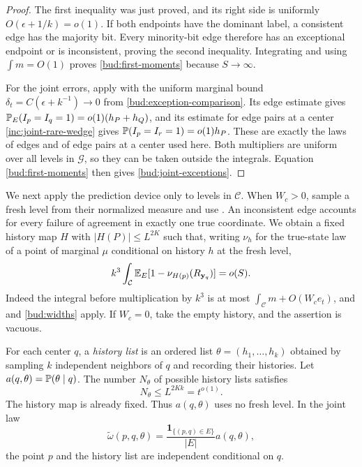 \begin{proof}
The first inequality was just proved, and its right side is uniformly
$O(\epsilon+1/k)=o(1)$.  If both endpoints have the dominant label,
a consistent edge has the majority bit.  Every minority-bit edge
therefore has an exceptional endpoint or is inconsistent, proving the
second inequality.  Integrating and using $\int m=O(1)$ proves
\eqref{bud:first-moments} because $S\to\infty$.

For the joint errors, apply  with the uniform marginal
bound $\delta_t=C(\epsilon+k^{-1})\to0$ from
\eqref{bud:exception-comparison}.  Its edge estimate gives
$\mathbb P_E(I_p=I_q=1)=o(1)(h_P+h_Q)$, and its estimate for edge pairs at a center
\eqref{inc:joint-rare-wedge} gives $\mathbb P(I_p=I_r=1)=o(1)h_P$.  These are exactly the laws of edges and
of edge pairs at a center used here.  Both multipliers are uniform over all levels
in $\mathcal G$, so they can be taken outside the integrals.
Equation \eqref{bud:first-moments} then gives
\eqref{bud:joint-exceptions}.
\end{proof}

We next apply the prediction device only to levels in $\mathcal C$.  When
$W_c>0$, sample a fresh level from their normalized measure and use
.  An inconsistent edge accounts for every failure of agreement in exactly one true coordinate.  We obtain a fixed history map $H$ with
$|H(P)|\le L^{2K}$ such that, writing $\nu_h$ for the true-state law
of a point of marginal $\mu$ conditional on history $h$ at the fresh
level,
\begin{equation}\label{bud:prediction-error}
 k^3\int_{\mathcal C}\mathbb E_E[1-\nu_{H(p)}(R_{\mathbf y_q})]=o(S).
\end{equation}
Indeed the integral before multiplication by $k^3$ is at most
$\int_{\mathcal C}m+O(W_c e_t)$, and
 and \eqref{bud:widths} apply.  If $W_c=0$,
take the empty history, and the assertion is vacuous.

For each center $q$, a \emph{history list} is an ordered list
$\theta=(h_1,\ldots,h_k)$ obtained by sampling $k$ independent
neighbors of $q$ and recording their histories.  Let
$a(q,\theta)=\mathbb P(\theta\mid q)$.  The number $N_\theta$ of possible
history lists satisfies
\begin{equation}\label{bud:template-count}
 N_\theta\le L^{2Kk}=t^{o(1)}.
\end{equation}
The history map is already fixed.  Thus $a(q,\theta)$ uses no fresh
level.  In the joint law
\begin{equation}\label{bud:joint-law}
 \widetilde\omega(p,q,\theta)=\frac{\mathbf1_{\{(p,q)\in E\}}}{|E|}
                         a(q,\theta),
\end{equation}
the point $p$ and the history list are independent conditional on $q$.

